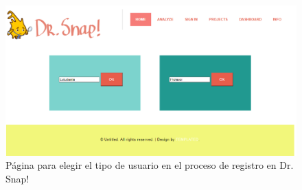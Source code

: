 \documentclass[a4paper, 12pt]{book}
\begin{document}
\begin{figure}[h]
\centering
            \includegraphics[scale=0.5]{img/tipo.PNG}
            \caption{Página para elegir el tipo de usuario en el proceso de registro en Dr. Snap!}
            \label{figura:tipo}
    \end{figure}
    
\end{document}
